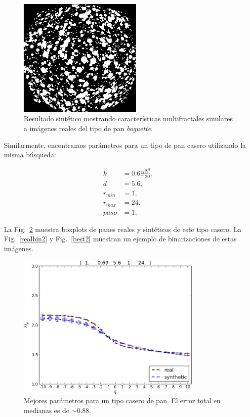 \begin{figure}[!ht]
\begin{center}
\includegraphics[width=6cm]{figures/best}
\caption{Resultado sintético mostrando características multifractales similares a imágenes reales del tipo de pan {\em baguette}.}
\label{best}
\end{center}
\end{figure}

Similarmente, encontramos parámetros para un tipo de pan casero utilizando la misma búsqueda:

\begin{align*}
k &= 0.69 \frac{N^{3}}{20} ,\\
d &=5.6,\\
r_{min} &=1,\\
r_{max} &=24.\\
paso &=1,
\end{align*}

La Fig.~\ref{bestboxplot2} muestra boxplots de panes reales y sintéticos de este tipo casero.
La Fig.~\ref{realbin2} y  Fig.~\ref{best2} muestran un ejemplo de binarizaciones de estas imágenes. 


\begin{figure}[!ht]
\includegraphics[width=9cm]{figures/bestboxplot2}
\caption[Mejores parámetros de síntesis para un tipo casero de pan]{Mejores parámetros para un tipo casero de pan. El error total en medianas es de $\sim 0.88$.}
\label{bestboxplot2}
\end{figure}

